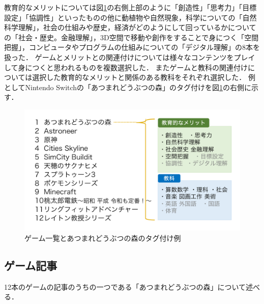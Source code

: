 教育的なメリットについては図\ref{fig:ゲーム一覧}の右側上部のように「創造性」「思考力」「目標設定」「協調性」といったものの他に動植物や自然現象，科学についての「自然科学理解」，社会の仕組みや歴史，経済がどのようにして回っているかについての「社会・歴史。金融理解」，3D空間で移動や創作をすることで身につく「空間把握」，コンピュータやプログラムの仕組みについての「デジタル理解」の8本を扱った．
ゲームとメリットとの関連付けについては様々なコンテンツをプレイして身につくと思われるものを複数選択した．
またゲームと教科の関連付けについては選択した教育的なメリットと関係のある教科をそれぞれ選択した．
例としてNintendo Switchの「あつまれどうぶつの森」のタグ付けを図\ref{fig:ゲーム一覧}の右側に示す．

\vspace{1zh}
\begin{figure}[H]
\begin{center}
 \includegraphics[keepaspectratio, scale=0.35]{PDF/games.pdf}
\end{center}
 \caption{ゲーム一覧とあつまれどうぶつの森のタグ付け例}
 \label{fig:ゲーム一覧}
\end{figure}

\newpage

\subsection{ゲーム記事}\label{ゲーム記事}
12本のゲームの記事のうちの一つである「あつまれどうぶつの森」について述べる．


